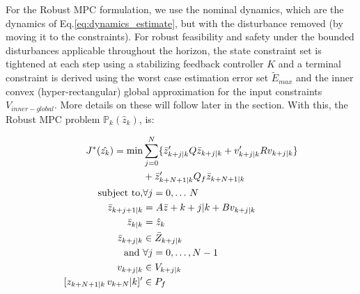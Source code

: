 For the Robust MPC formulation, we use the nominal dynamics, which are the dynamics of Eq.\ref{eq:dynamics_estimate}, but with the disturbance removed (by moving it to the constraints). For robust feasibility and safety under the bounded disturbances applicable throughout the horizon, the state constraint set is tightened at each step using a stabilizing feedback controller $K$ and a terminal constraint is derived using the worst case estimation error set $\tilde{E}_{max}$ and the inner convex (hyper-rectangular) global approximation for the input constraints $V_{inner-global}$. More details on these will follow later in the section.
With this, the Robust MPC problem $\mathbb{P}_k(\hat{z}_k)$, is:

\begin{subequations} \label{eq:RMPC}
\begin{align}
J^{*}(\hat{z_k}) = \text{min} &\sum_{j=0}^{N}\lbrace\bar{z}_{k+j|k}'Q\bar{z}_{k+j|k} + {v}_{k+j|k}'R{v}_{k+j|k}\rbrace \nonumber \\ 
&+ \bar{z}_{k+N+1|k}'Q_f\bar{z}_{k+N+1|k} \label{eq:cost} \\
\text{subject to,} &\forall j=0,\dotsc\,N \nonumber \\
\bar{z}_{k+j+1|k}&=A\bar{z}+{k+j|k} + Bv_{k+j|k} \label{eq:nom_dyn} \\
\bar{z}_{k|k} &= \hat{z}_{k} \label{eq:init_cond}\\
\bar{z}_{k+j|k}& \in \bar{Z}_{k+j|k} \label{eq:states_con}\\
\text{and } &\forall j=0,\dotsc,N-1 \nonumber \\
v_{k+j|k} & \in V_{k+j|k} \label{eq:input_con} \\
[z_{k+N+1|k} \, v_{k+N}|k]' & \in P_f \label{eq:joint_term} 
\end{align}
\end{subequations}

